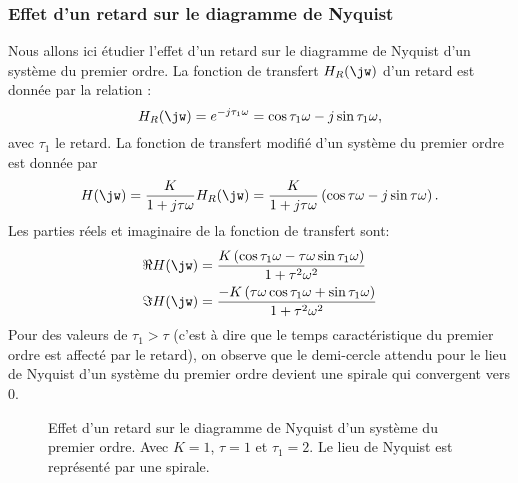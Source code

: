 \subsubsection{Effet d'un retard sur le diagramme de Nyquist}
Nous allons ici étudier l'effet d'un retard sur le diagramme de Nyquist 
d'un système du premier ordre.
La fonction de transfert $H_R(\jw)$ d'un retard est donnée par la relation :
\[
H_R(\jw)=e^{-j\tau_1\omega}=\cos{\tau_1\omega}-j\sin{\tau_1\omega},
\]
avec $\tau_1$ le retard. 
La fonction de transfert modifié d'un système du premier ordre est donnée par
\[
H(\jw)=\dfrac{K}{1+j\tau\omega}H_R(\jw)=
\dfrac{K}{1+j\tau\omega}\left(\cos{\tau\omega}-j\sin{\tau\omega}\right).
\]
Les parties réels et imaginaire de la fonction de transfert sont:
\begin{align*}
    \Re{H(\jw)}&=
    \dfrac{K\left(\cos{\tau_1\omega-\tau\omega\sin{\tau_1\omega}}\right)}
      {1+\tau^2\omega^2}\\
    \Im{H(\jw)}&=
    \dfrac{-K\left(\tau\omega\cos{\tau_1\omega+\sin{\tau_1\omega}}\right)}
    {1+\tau^2\omega^2}
\end{align*}
Pour des valeurs de $\tau_1>\tau$ (c'est à dire que le temps caractéristique 
du premier ordre est affecté par le retard), on observe que le demi-cercle 
attendu pour le lieu de Nyquist d'un système du premier ordre devient une
spirale qui convergent vers 0.
\begin{figure}[!h]
    \centering
    
    \caption{Effet d'un retard sur le diagramme de Nyquist d'un système 
             du premier ordre. Avec $K=1$, $\tau=1$ et $\tau_1=2$. Le lieu 
             de Nyquist est représenté par une spirale.
             \label{fig-nyquist_effet_retard_1}}
\end{figure}

